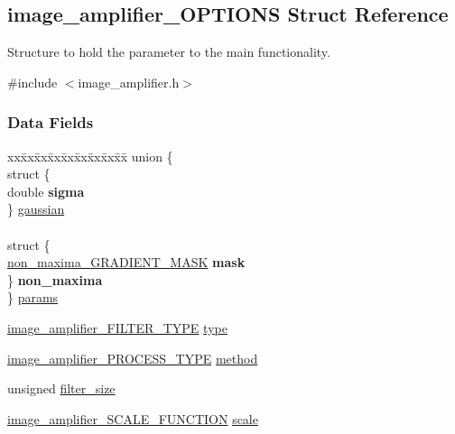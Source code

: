 \hypertarget{a00002}{\subsection{image\-\_\-amplifier\-\_\-\-O\-P\-T\-I\-O\-N\-S Struct Reference}
\label{a00002}
}


Structure to hold the parameter to the main functionality.  




{\ttfamily \#include $<$image\-\_\-amplifier.\-h$>$}

\subsubsection*{Data Fields}
\begin{DoxyCompactItemize}
\item 
\begin{tabbing}
xx\=xx\=xx\=xx\=xx\=xx\=xx\=xx\=xx\=\kill
union \{\\
\>struct \{\\
\>\>double {\bfseries sigma}\\
\>\} \hyperlink{a00002_a11c159f011f710080ba5edd5b56430e7}{gaussian}\\
\>\>\\
\>struct \{\\
\>\>\hyperlink{a00015_a7dd815a0a3b2d6f876ff33571eb2e12d}{non\_maxima\_GRADIENT\_MASK} {\bfseries mask}\\
\>\} {\bfseries non\_maxima}\\
\} \hyperlink{a00002_ac7c75806a264a52c487659515f68ff31}{params}\\

\end{tabbing}\item 
\hyperlink{a00011_ab9ab1f07cda00e3ff3333457d61d7cca}{image\-\_\-amplifier\-\_\-\-F\-I\-L\-T\-E\-R\-\_\-\-T\-Y\-P\-E} \hyperlink{a00002_a4bc5ec751e2e2013dafc3a6b65e24323}{type}
\item 
\hyperlink{a00011_a6409b55393af13a405538b966d80ec1d}{image\-\_\-amplifier\-\_\-\-P\-R\-O\-C\-E\-S\-S\-\_\-\-T\-Y\-P\-E} \hyperlink{a00002_aa6925bbe38cfca63e79e7d2ea8847396}{method}
\item 
unsigned \hyperlink{a00002_aa81fa5511538092f08167cbd38091c2f}{filter\-\_\-size}
\item 
\hyperlink{a00011_a1ea386c90cd9638e2f2576d348eb122f}{image\-\_\-amplifier\-\_\-\-S\-C\-A\-L\-E\-\_\-\-F\-U\-N\-C\-T\-I\-O\-N} \hyperlink{a00002_a9b180d0032ef65ead5962c570736e423}{scale}
\end{DoxyCompactItemize}


